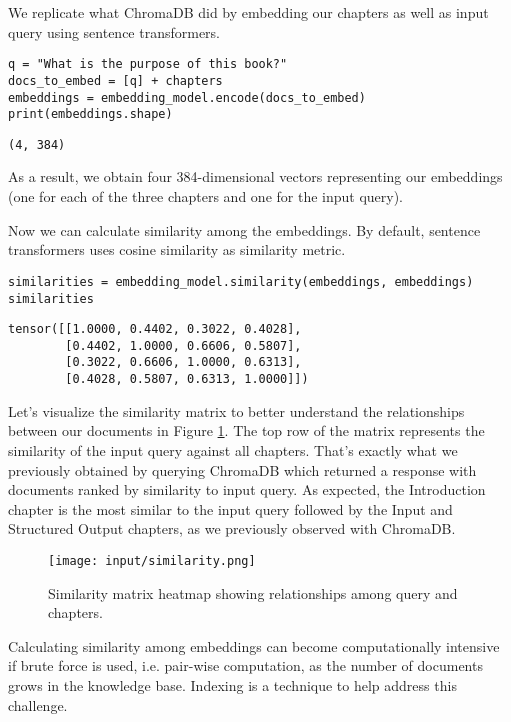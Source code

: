We replicate what ChromaDB did by embedding our chapters as well as input query using sentence transformers.

\begin{verbatim}
q = "What is the purpose of this book?"
docs_to_embed = [q] + chapters
embeddings = embedding_model.encode(docs_to_embed)
print(embeddings.shape)
\end{verbatim}

\begin{verbatim}
(4, 384)
\end{verbatim}

As a result, we obtain four 384-dimensional vectors representing our embeddings (one for each of the three chapters and one for the input query).

Now we can calculate similarity among the embeddings. By default, sentence transformers uses cosine similarity as similarity metric.

\begin{verbatim}
similarities = embedding_model.similarity(embeddings, embeddings)
similarities
\end{verbatim}

\begin{verbatim}
tensor([[1.0000, 0.4402, 0.3022, 0.4028],
        [0.4402, 1.0000, 0.6606, 0.5807],
        [0.3022, 0.6606, 1.0000, 0.6313],
        [0.4028, 0.5807, 0.6313, 1.0000]])
\end{verbatim}

Let's visualize the similarity matrix to better understand the relationships between our documents in Figure \ref{similarities}. The top row of the matrix represents the similarity of the input query against all chapters. That's exactly what we previously obtained by querying ChromaDB which returned a response with documents ranked by similarity to input query. As expected, the Introduction chapter is the most similar to the input query followed by the Input and Structured Output chapters, as we previously observed with ChromaDB.

\begin{figure}[H]
\centering
\texttt{[image: input/similarity.png]}
\caption{Similarity matrix heatmap showing relationships among query and chapters.}
\label{similarities}
\end{figure}


Calculating similarity among embeddings can become computationally intensive if brute force is used, i.e. pair-wise computation, as the number of documents grows in the knowledge base. Indexing is a technique to help address this challenge.

